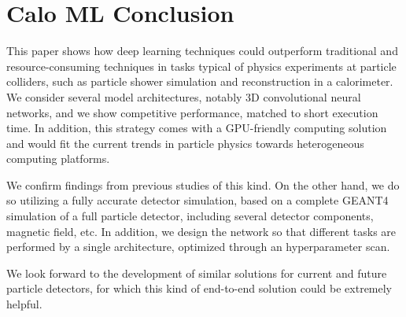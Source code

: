 \chapter{Calo ML Conclusion}

This paper shows how deep learning techniques could outperform traditional and resource-consuming techniques in  tasks typical of physics experiments at particle colliders, such as particle shower simulation and reconstruction in a calorimeter.
We consider several model architectures, notably 3D convolutional neural networks, and we show competitive performance, matched to short execution time. In addition, this strategy comes with a GPU-friendly computing solution and would fit the current trends in particle physics towards heterogeneous computing platforms. 

We confirm findings from previous studies of this kind. On the other hand, we do so utilizing a fully accurate detector simulation, based on a complete GEANT4 simulation of a full particle detector, including several detector components, magnetic field, etc. In addition, we design the network so that different tasks are performed by a single architecture, optimized through an hyperparameter scan. 

We look forward to the development of similar solutions for current and future particle detectors, for which this kind of end-to-end solution could be extremely helpful. 